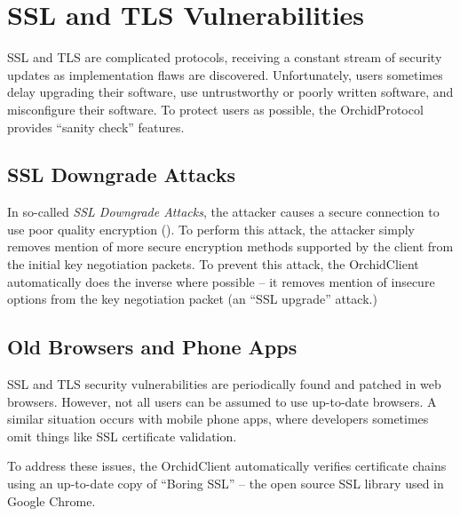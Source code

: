 \documentclass{article}
\newcommand{\orchid}{Orchid}
\newcommand{\Orchid}{\orchid}
\begin{document}
\section{SSL and TLS Vulnerabilities}

SSL and TLS are complicated protocols, receiving a constant stream of
security updates as implementation flaws are discovered.
Unfortunately, users sometimes delay upgrading their software, use
untrustworthy or poorly written software, and misconfigure their
software. To protect users as possible, the \Orchid Protocol provides
``sanity check'' features.

\subsection{SSL Downgrade Attacks}

In so-called \emph{SSL Downgrade Attacks}, the attacker causes a
secure connection to use poor quality encryption
(\cite{ssl-downgrade}). To perform this attack, the attacker simply
removes mention of more secure encryption methods supported by the
client from the initial key negotiation packets. To prevent this
attack, the \Orchid Client automatically does the inverse where
possible -- it removes mention of insecure options from the key
negotiation packet (an ``SSL upgrade'' attack.)

\subsection{Old Browsers and Phone Apps}

SSL and TLS security vulnerabilities are periodically found and
patched in web browsers. However, not all users can be assumed to use
up-to-date browsers. A similar situation occurs with mobile phone
apps, where developers sometimes omit things like SSL certificate
validation.

To address these issues, the \Orchid Client automatically verifies
certificate chains using an up-to-date copy of ``Boring SSL'' -- the
open source SSL library used in Google Chrome.



\end{document}
